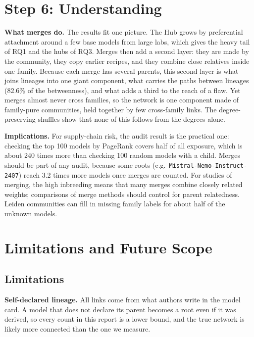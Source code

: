 \documentclass[conference]{IEEEtran}
\newcommand{\model}[1]{\texttt{\small #1}}
\begin{document}
\section{Step 6: Understanding}

\textbf{What merges do.} The results fit one picture. The Hub grows by
preferential attachment around a few base models from large labs, which gives
the heavy tail of RQ1 and the hubs of RQ3. Merges then add a second layer: they
are made by the community, they copy earlier recipes, and they combine close
relatives inside one family. Because each merge has several parents, this
second layer is what joins lineages into one giant component, what carries the
paths between lineages (82.6\% of the betweenness), and what adds a third to the
reach of a flaw. Yet merges almost never cross families, so the network is one
component made of family-pure communities, held together by few cross-family
links. The degree-preserving shuffles show that none of this follows from the
degrees alone.

\textbf{Implications.} For supply-chain risk, the audit result is the practical
one: checking the top 100 models by PageRank covers half of all exposure, which
is about 240 times more than checking 100 random models with a child. Merges should be
part of any audit, because some roots (e.g.\ \model{Mistral-Nemo-Instruct-2407})
reach 3.2 times more models once merges are counted. For
studies of merging, the high inbreeding means that many merges combine closely
related weights; comparisons of merge methods should control for parent
relatedness. Leiden communities can fill in missing family labels for about
half of the unknown models.

\section{Limitations and Future Scope}

\subsection{Limitations}

\textbf{Self-declared lineage.} All links come from what authors write in the
model card. A model that does not declare its parent becomes a root even if it
was derived, so every count in this report is a lower bound, and the true
network is likely more connected than the one we measure.
\end{document}
